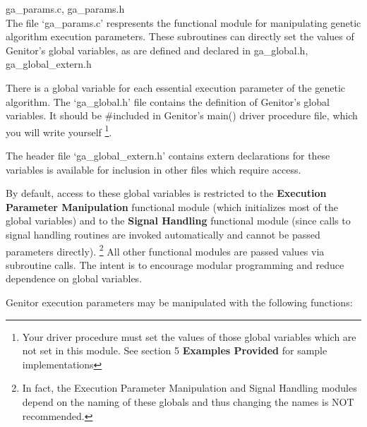 ga\_params.c, ga\_params.h
\\
The file `ga\_params.c' respresents the functional module for manipulating
genetic algorithm execution parameters.  These subroutines can directly set
the values of Genitor's global variables, as are defined and declared in
ga\_global.h, ga\_global\_extern.h

There is a global variable for each essential execution parameter 
of the genetic algorithm.  The `ga\_global.h' file contains the
definition of Genitor's global variables.  It should be \#included in
Genitor's main() driver procedure file, which you will write yourself
\footnote{ Your driver procedure must set the values of those global variables
which are not set in this module.  See section 5 {\bf Examples Provided} for
sample implementations}.  

The header file `ga\_global\_extern.h' contains extern declarations
for these variables is available for inclusion in other files which
require access.

By default, access to these global variables is restricted to the
{\bf Execution Parameter Manipulation} functional module (which
initializes most of the global variables) and to the {\bf Signal Handling}
functional module (since calls to signal handling routines are invoked
automatically and cannot be passed parameters directly).  
\footnote {In fact, the Execution Parameter Manipulation and Signal
Handling modules depend on the naming of these globals and thus changing
the names is NOT recommended.} 
All other functional modules are passed values via subroutine calls.
The intent is to encourage modular programming and reduce dependence on
global variables.

Genitor execution parameters may be manipulated with the following
functions:

